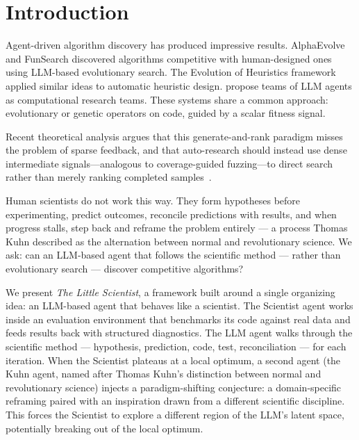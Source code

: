 \documentclass[11pt,a4paper]{article}
\begin{document}
\section{Introduction}
\label{sec:intro}

Agent-driven algorithm discovery has produced impressive results. AlphaEvolve \citep{novikov2025alphaevolve} and FunSearch \citep{romera2024funsearch} discovered algorithms competitive with human-designed ones using LLM-based evolutionary search. The Evolution of Heuristics framework \citep{liu2024eoh} applied similar ideas to automatic heuristic design. \citet{li2026agentic} propose teams of LLM agents as computational research teams. These systems share a common approach: evolutionary or genetic operators on code, guided by a scalar fitness signal.

Recent theoretical analysis argues that this generate-and-rank paradigm misses the problem of sparse feedback, and that auto-research should instead use dense intermediate signals---analogous to coverage-guided fuzzing---to direct search rather than merely ranking completed samples~\citep{he2026agentic}.

Human scientists do not work this way. They form hypotheses before experimenting, predict outcomes, reconcile predictions with results, and when progress stalls, step back and reframe the problem entirely --- a process Thomas Kuhn \citep{kuhn1962structure} described as the alternation between normal and revolutionary science. We ask: can an LLM-based agent that follows the scientific method --- rather than evolutionary search --- discover competitive algorithms?

We present \emph{The Little Scientist}, a framework built around a single organizing idea: an LLM-based agent that behaves like a scientist. The Scientist agent works inside an evaluation environment that benchmarks its code against real data and feeds results back with structured diagnostics. The LLM agent walks through the scientific method --- hypothesis, prediction, code, test, reconciliation --- for each iteration. When the Scientist plateaus at a local optimum, a second agent (the Kuhn agent, named after Thomas Kuhn's \citep{kuhn1962structure} distinction between normal and revolutionary science) injects a paradigm-shifting conjecture: a domain-specific reframing paired with an inspiration drawn from a different scientific discipline. This forces the Scientist to explore a different region of the LLM's latent space, potentially breaking out of the local optimum.
\end{document}
